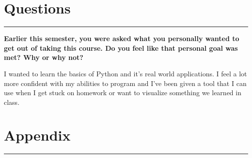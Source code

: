 \documentclass[12pt]{report}
\begin{document}
\newpage
\section*{Questions}
\hrule
\vspace{1cm}
\setlength{\parindent}{5ex}
\textbf{Earlier this semester, you were asked what you personally wanted to get out of taking this
course. Do you feel like that personal goal was met? Why or why not?}\par

\vspace{.5cm}
I wanted to learn the basics of Python and it's real world applications. I feel a lot more confident with my abilities to program and I've been given a tool that I can use when I get stuck on homework or want to visualize something we learned in class. 

\newpage
\section*{Appendix}
\hrule
\vspace{1cm}
\setlength{\parindent}{5ex}
\end{document}
